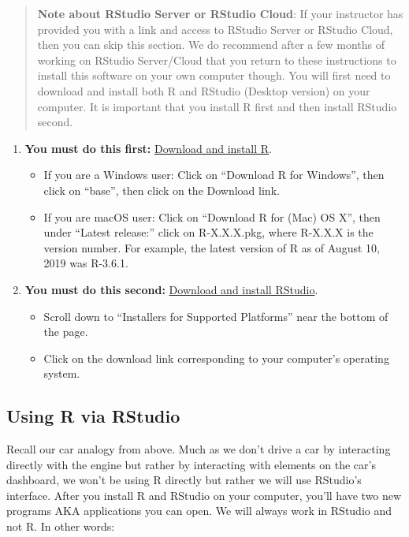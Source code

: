 \documentclass[
  letterpaper,
  DIV=11,
  numbers=noendperiod]{scrreprt}
\providecommand{\tightlist}{%
  \setlength{\itemsep}{0pt}\setlength{\parskip}{0pt}}\usepackage{longtable,booktabs,array}
\theoremstyle{definition}
\theoremstyle{remark}
\begin{document}
\begin{quote}
\textbf{Note about RStudio Server or RStudio Cloud}: If your instructor
has provided you with a link and access to RStudio Server or RStudio
Cloud, then you can skip this section. We do recommend after a few
months of working on RStudio Server/Cloud that you return to these
instructions to install this software on your own computer though. You
will first need to download and install both R and RStudio (Desktop
version) on your computer. It is important that you install R first and
then install RStudio second.
\end{quote}

\begin{enumerate}
\def\labelenumi{\arabic{enumi}.}
\item
  \textbf{You must do this first:}
  \href{https://cloud.r-project.org/}{Download and install R}.

  \begin{itemize}
  \tightlist
  \item
    If you are a Windows user: Click on ``Download R for Windows'', then
    click on ``base'', then click on the Download link.
  \item
    If you are macOS user: Click on ``Download R for (Mac) OS X'', then
    under ``Latest release:'' click on R-X.X.X.pkg, where R-X.X.X is the
    version number. For example, the latest version of R as of August
    10, 2019 was R-3.6.1.
  \end{itemize}
\item
  \textbf{You must do this second:}
  \href{https://www.rstudio.com/products/rstudio/download/}{Download and
  install RStudio}.

  \begin{itemize}
  \tightlist
  \item
    Scroll down to ``Installers for Supported Platforms'' near the
    bottom of the page.
  \item
    Click on the download link corresponding to your computer's
    operating system.
  \end{itemize}
\end{enumerate}

\hypertarget{using-r-via-rstudio}{%
\subsection{Using R via RStudio}\label{using-r-via-rstudio}}

Recall our car analogy from above. Much as we don't drive a car by
interacting directly with the engine but rather by interacting with
elements on the car's dashboard, we won't be using R directly but rather
we will use RStudio's interface. After you install R and RStudio on your
computer, you'll have two new programs AKA applications you can open. We
will always work in RStudio and not R. In other words:
\end{document}
